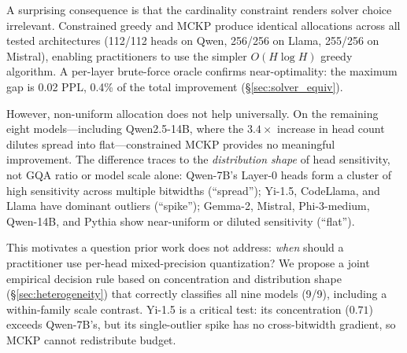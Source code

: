 A surprising consequence is that the cardinality constraint renders solver choice irrelevant.
Constrained greedy and MCKP produce identical allocations across all tested architectures (112/112 heads on Qwen, 256/256 on Llama, 255/256 on Mistral), enabling practitioners to use the simpler $O(H \log H)$ greedy algorithm.
A per-layer brute-force oracle confirms near-optimality: the maximum gap is 0.02 PPL, 0.4\% of the total improvement (\S\ref{sec:solver_equiv}).

However, non-uniform allocation does not help universally.
On the remaining eight models---including Qwen2.5-14B, where the $3.4\times$ increase in head count dilutes spread into flat---constrained MCKP provides no meaningful improvement.
The difference traces to the \emph{distribution shape} of head sensitivity, not GQA ratio or model scale alone: Qwen-7B's Layer-0 heads form a cluster of high sensitivity across multiple bitwidths (``spread''); Yi-1.5, CodeLlama, and Llama have dominant outliers (``spike''); Gemma-2, Mistral, Phi-3-medium, Qwen-14B, and Pythia show near-uniform or diluted sensitivity (``flat'').

This motivates a question prior work does not address: \emph{when} should a practitioner use per-head mixed-precision quantization?
We propose a joint empirical decision rule based on concentration and distribution shape (\S\ref{sec:heterogeneity}) that correctly classifies all nine models (9/9), including a within-family scale contrast.
Yi-1.5 is a critical test: its concentration ($0.71$) exceeds Qwen-7B's, but its single-outlier spike has no cross-bitwidth gradient, so MCKP cannot redistribute budget.


